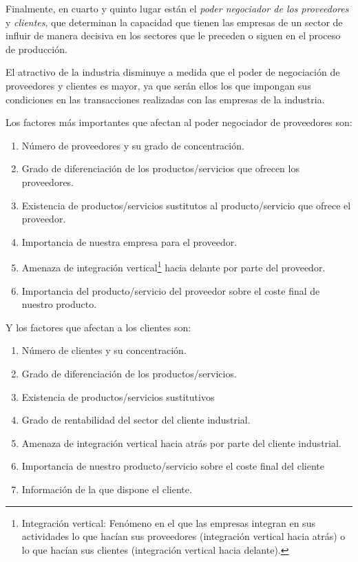 \documentclass[10pt,a4paper,spanish]{report}
\begin{document}
            Finalmente, en cuarto y quinto lugar están el \textit{\textcolor[rgb]{0.3,0.4,0.6}{poder negociador de los proveedores}} y \textit{\textcolor[rgb]{0.3,0.4,0.6}{clientes}}, que determinan la capacidad que tienen las empresas de un sector de influir de manera decisiva en los sectores que le preceden o siguen en el proceso de producción.

            El atractivo de la industria disminuye a medida que el poder de negociación de proveedores y clientes es mayor, ya que serán ellos los que impongan sus condiciones en las transacciones realizadas con las empresas de la industria.

            Los factores más importantes que afectan al poder negociador de proveedores son:
            \begin{enumerate}
                  \item Número de proveedores y su grado de concentración.
                  \item Grado de diferenciación de los productos/servicios que ofrecen los proveedores.
                  \item Existencia de productos/servicios sustitutos al producto/servicio que ofrece el proveedor.
                  \item Importancia de nuestra empresa para el proveedor.
                  \item Amenaza de integración vertical\footnote{Integración vertical: Fenómeno en el que las empresas integran en sus actividades lo que hacían sus proveedores (integración vertical hacia atrás) o lo que hacían sus clientes (integración vertical hacia delante).} hacia delante por parte del proveedor.
                  \item Importancia del producto/servicio del proveedor sobre el coste final de nuestro producto.
            \end{enumerate}

            Y los factores que afectan a los clientes son:
            \begin{enumerate}
                  \item Número de clientes y su concentración.
                  \item Grado de diferenciación de los productos/servicios.
                  \item Existencia de productos/servicios sustitutivos
                  \item Grado de rentabilidad del sector del cliente industrial.
                  \item Amenaza de integración vertical hacia atrás por parte del cliente industrial.
                  \item Importancia de nuestro producto/servicio sobre el coste final del cliente
                  \item Información de la que dispone el cliente.
            \end{enumerate}
\end{document}
